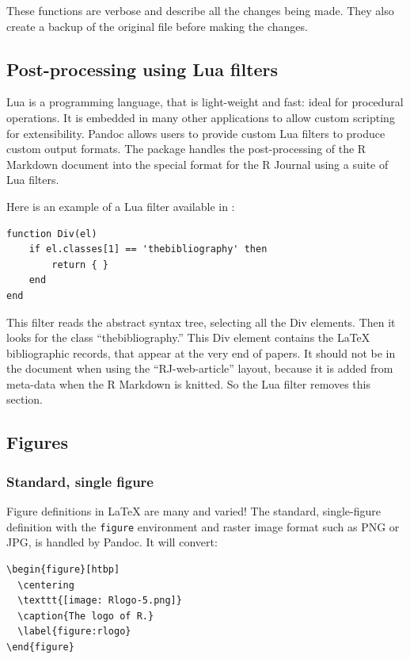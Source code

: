 These functions are verbose and describe all the changes being made. They also create a backup of the original file before making the changes.

\subsection{Post-processing using Lua filters}\label{post-processing-using-lua-filters}

Lua \citep{lua} is a programming language, that is light-weight and fast: ideal for procedural operations. It is embedded in many other applications to allow custom scripting for extensibility. Pandoc allows users to provide custom Lua filters to produce custom output formats. The  package handles the post-processing of the R Markdown document into the special format for the R Journal using a suite of Lua filters.

Here is an example of a Lua filter available in :

\begin{verbatim}
function Div(el)
    if el.classes[1] == 'thebibliography' then
        return { }
    end
end
\end{verbatim}

This filter reads the abstract syntax tree, selecting all the Div elements. Then it looks for the class ``thebibliography.'' This Div element contains the LaTeX bibliographic records, that appear at the very end of papers. It should not be in the document when using the ``RJ-web-article'' layout, because it is added from meta-data when the R Markdown is knitted. So the Lua filter removes this section.

\subsection{Figures}\label{figures}

\subsubsection{Standard, single figure}\label{standard-single-figure}

Figure definitions in LaTeX are many and varied! The standard, single-figure definition with the \texttt{figure} environment and raster image format such as PNG or JPG, is handled by Pandoc. It will convert:

\begin{verbatim}
\begin{figure}[htbp]
  \centering
  \texttt{[image: Rlogo-5.png]}
  \caption{The logo of R.}
  \label{figure:rlogo}
\end{figure}
\end{verbatim}

